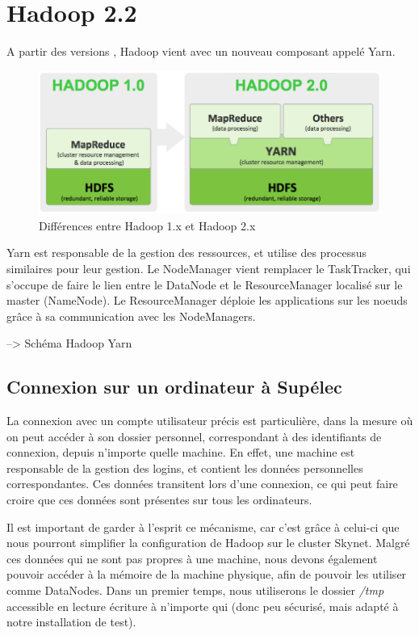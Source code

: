 \section{Hadoop 2.2}
\label{sec:hadoop-2.2}

\par A partir des versions , Hadoop vient avec un nouveau composant appelé Yarn. 

\begin{figure}[h!]
  \centering
  \includegraphics[width=12cm]{images/yarn.png}
  \caption{Différences entre Hadoop 1.x et Hadoop 2.x}
  \label{fig:yarn}
\end{figure}

Yarn est responsable de la gestion des ressources, et utilise des processus similaires pour leur gestion. Le NodeManager vient remplacer le TaskTracker, qui s'occupe de faire le lien entre le DataNode et le ResourceManager localisé sur le master (NameNode). Le ResourceManager déploie les applications sur les noeuds grâce à sa communication avec les NodeManagers.

--> Schéma Hadoop Yarn

\subsection{Connexion sur un ordinateur à Supélec}
\label{sec:connexion-sur-un}

\par La connexion avec un compte utilisateur précis est particulière, dans la mesure où on peut accéder à son dossier personnel, correspondant à des identifiants de connexion, depuis n'importe quelle machine. En effet, une machine est responsable de la gestion des logins, et contient les données personnelles correspondantes. Ces données transitent lors d'une connexion, ce qui peut faire croire que ces données sont présentes sur tous les ordinateurs.

\par Il est important de garder à l'esprit ce mécanisme, car c'est grâce à celui-ci que nous pourront simplifier la configuration de Hadoop sur le cluster Skynet. Malgré ces données qui ne sont pas propres à une machine, nous devons également pouvoir accéder à la mémoire de la machine physique, afin de pouvoir les utiliser comme DataNodes. Dans un premier temps, nous utiliserons le dossier \emph{/tmp} accessible en lecture écriture à n'importe qui (donc peu sécurisé, mais adapté à notre installation de test).


